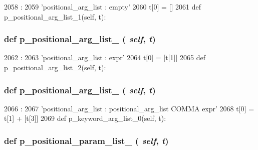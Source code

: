 \begin{DoxyCode}
2058                                         :
2059         'positional_arg_list : empty'
2060         t[0] = []
2061 
    def p_positional_arg_list_1(self, t):
\end{DoxyCode}
\hypertarget{classisa__parser_1_1ISAParser_a439e179e35f3b0a2d79c0001a31e4167}{
\subsubsection[{p\_\-positional\_\-arg\_\-list\_\-1}]{\setlength{\rightskip}{0pt plus 5cm}def p\_\-positional\_\-arg\_\-list\_ ( {\em self}, \/   {\em t})}}
\label{classisa__parser_1_1ISAParser_a439e179e35f3b0a2d79c0001a31e4167}



\begin{DoxyCode}
2062                                         :
2063         'positional_arg_list : expr'
2064         t[0] = [t[1]]
2065 
    def p_positional_arg_list_2(self, t):
\end{DoxyCode}
\hypertarget{classisa__parser_1_1ISAParser_a17f4ddd9d2367afc4cdab328f7514a3e}{
\subsubsection[{p\_\-positional\_\-arg\_\-list\_\-2}]{\setlength{\rightskip}{0pt plus 5cm}def p\_\-positional\_\-arg\_\-list\_ ( {\em self}, \/   {\em t})}}
\label{classisa__parser_1_1ISAParser_a17f4ddd9d2367afc4cdab328f7514a3e}



\begin{DoxyCode}
2066                                         :
2067         'positional_arg_list : positional_arg_list COMMA expr'
2068         t[0] = t[1] + [t[3]]
2069 
    def p_keyword_arg_list_0(self, t):
\end{DoxyCode}
\hypertarget{classisa__parser_1_1ISAParser_a8edf3fe36a9a76b8413c6ad5e1cec1b8}{
\subsubsection[{p\_\-positional\_\-param\_\-list\_\-0}]{\setlength{\rightskip}{0pt plus 5cm}def p\_\-positional\_\-param\_\-list\_ ( {\em self}, \/   {\em t})}}
\label{classisa__parser_1_1ISAParser_a8edf3fe36a9a76b8413c6ad5e1cec1b8}



